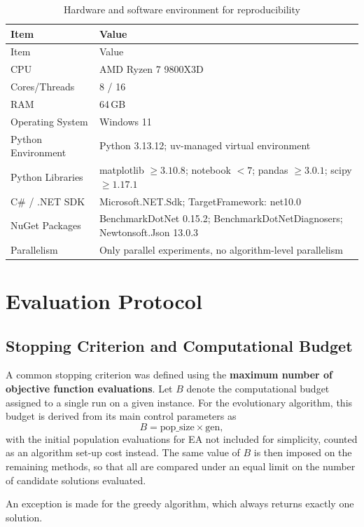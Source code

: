 \documentclass[12pt,a4paper]{report}
\begin{document}
\begin{longtable}{ll}
\caption{Hardware and software environment for reproducibility}\label{tab:hardware_software}\\
\toprule
Item & Value \\
\midrule
\endfirsthead
\toprule
Item & Value \\
\midrule
\endhead
CPU & AMD Ryzen 7 9800X3D \\
Cores/Threads & 8 / 16 \\
RAM & 64\,GB \\
Operating System & Windows 11 \\
Python Environment & Python 3.13.12; uv-managed virtual environment\\
Python Libraries & matplotlib $\ge 3.10.8$; notebook $< 7$; pandas $\ge 3.0.1$; scipy $\ge 1.17.1$ \\
C\# / .NET SDK & Microsoft.NET.Sdk; TargetFramework: net10.0\\
NuGet Packages & BenchmarkDotNet 0.15.2; BenchmarkDotNetDiagnosers; Newtonsoft.Json 13.0.3 \\
Parallelism & Only parallel experiments, no algorithm-level parallelism \\
\bottomrule
\end{longtable}



\section{Evaluation Protocol}
\subsection{Stopping Criterion and Computational Budget}

A common stopping criterion was defined using the \textbf{maximum number of objective function evaluations}. Let \(B\) denote the computational budget assigned to a single run on a given instance. For the evolutionary algorithm, this budget is derived from its main control parameters as
\[
B = \text{pop\_size} \times \text{gen},
\]
with the initial population evaluations for EA not included for simplicity, counted as an algorithm set-up cost instead. The same value of \(B\) is then imposed on the remaining methods, so that all are compared under an equal limit on the number of candidate solutions evaluated.

An exception is made for the greedy algorithm, which always returns exactly one solution.
\end{document}
